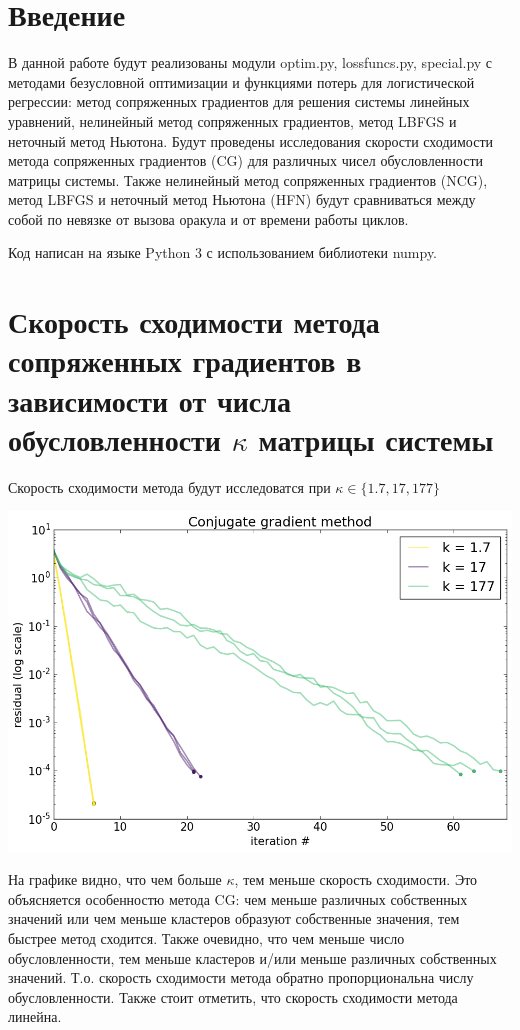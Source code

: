 \documentclass[12pt, a4paper]{article}
\begin{document}
    \section{Введение}
        В данной работе будут реализованы модули optim.py, lossfuncs.py, special.py с методами безусловной оптимизации и функциями потерь для логистической регрессии: метод сопряженных градиентов для решения системы линейных уравнений, нелинейный метод сопряженных градиентов, метод LBFGS и неточный метод Ньютона. Будут проведены исследования скорости сходимости метода сопряженных градиентов (CG) для различных чисел обусловленности матрицы системы. Также нелинейный метод сопряженных градиентов (NCG), метод LBFGS и неточный метод Ньютона (HFN) будут сравниваться между собой по невязке от вызова оракула и от времени работы циклов.

        Код написан на языке Python 3 с использованием библиотеки numpy.

    \section{Скорость сходимости метода сопряженных градиентов в зависимости от числа обусловленности $\kappa$ матрицы системы}
        Скорость сходимости метода будут исследоватся при $\kappa \in \{1.7, 17, 177\}$
        \begin{center}\includegraphics[width=\picwidth]{cg.png}\end{center}

        На графике видно, что чем больше $\kappa$, тем меньше скорость сходимости. Это объясняется особенностю метода CG: чем меньше различных собственных значений или чем меньше кластеров образуют собственные значения, тем быстрее метод сходится. Также очевидно, что чем меньше число обусловленности, тем меньше кластеров и/или меньше различных собственных значений. Т.о. скорость сходимости метода обратно пропорциональна числу обусловленности. Также стоит отметить, что скорость сходимости метода линейна.
\end{document}

